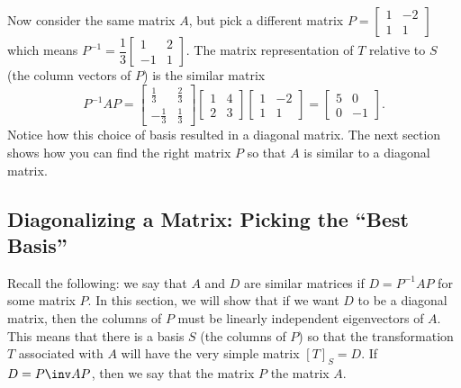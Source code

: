 \begin{example}
Now consider the same matrix
 $A$, but pick a different matrix 
$P=
\begin{bmatrix}
 1 & -2 \\
 1 & 1
\end{bmatrix} 
$ which means 
$P^{-1} = 
\dfrac{1}{3}\begin{bmatrix}
 1&2\\
-1&1
\end{bmatrix} 
$. The matrix representation of $T$ relative to $S$ (the column vectors of $P$) is the similar matrix 
$$
P^{-1}AP=\begin{bmatrix}
 \frac{1}{3} & \frac{2}{3} \\
 -\frac{1}{3} & \frac{1}{3}
\end{bmatrix} 
 \begin{bmatrix}
 1 & 4 \\
 2 & 3
\end{bmatrix} 
\begin{bmatrix}
 1 & -2 \\
 1 & 1
\end{bmatrix} 
=
\begin{bmatrix}
 5 & 0 \\
 0 & -1
\end{bmatrix} 
.$$  Notice how this choice of basis resulted in a diagonal matrix. The next section shows how you can find the right matrix $P$ so that $A$ is similar to a diagonal matrix.
\end{example}


\subsection{Diagonalizing a Matrix: Picking the ``Best Basis'' }
Recall the following: we say that $A$ and $D$ are similar matrices if $D=P^{-1}AP$ for some matrix $P$.   In this section, we will show that if we want $D$ to be a diagonal matrix, then the columns of $P$ must be linearly independent eigenvectors of $A$. This means that there is a basis $S$ (the columns of $P$) so that the transformation $T$ associated with $A$ will have the very simple matrix $[T]_S=D$.  If $D=P\inv A P$, then we say that the matrix $P$  the matrix $A$.



